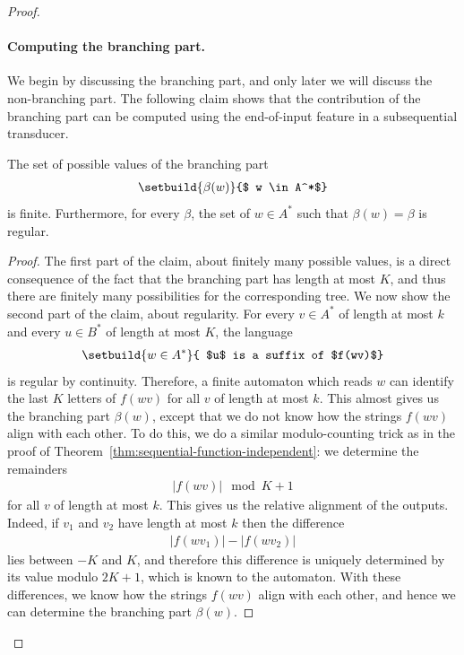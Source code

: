 \begin{proof}
\paragraph*{Computing the branching part.} We begin by discussing the branching part, and only later we will discuss the non-branching part.   The following claim shows that the contribution of the branching part can be computed using the end-of-input feature in a subsequential transducer.


\begin{claim}\label{claim:computing-branching-part} The set of possible values of the branching part 
    \begin{align*}
    \setbuild {\beta(w)}{$ w \in A^*$}
    \end{align*}
    is finite. Furthermore, for every $\beta$, the set of $w \in A^*$ such that $\beta(w) = \beta$ is regular.
\end{claim}
\begin{proof}
    The first part of the claim, about finitely many possible values, is a direct consequence of the fact that the branching part has length at most $K$, and thus there are finitely many possibilities for the corresponding tree.  We now show the second part of the claim, about regularity.
    For every $v \in A^*$ of length at most $k$ and every $u \in B^*$ of length at most $K$, the language 
    \begin{align*}
    \setbuild{ w \in A^*}{ $u$ is a suffix of $f(wv)$}
    \end{align*}
    is regular by continuity. Therefore, a finite automaton which reads $w$ can identify the last $K$ letters of $f(wv)$ for all $v$ of length at most $k$. This almost gives us the branching part $\beta(w)$, except that we do not know how the strings $f(wv)$ align with each other. To do this, we do a similar modulo-counting trick as in the proof of Theorem~\ref{thm:sequential-function-independent}: we determine the remainders
    \begin{align*}
    |f(wv)| \mod K+1
    \end{align*}
    for all $v$ of length at most $k$. This gives us the relative alignment
    of the outputs. Indeed, if $v_1$ and $v_2$ have length at most $k$ then the difference 
    \begin{align*}
    |f(wv_1)| - |f(wv_2)| 
    \end{align*}
    lies between $-K$ and $K$, and therefore this difference is uniquely determined by its value modulo $2K+1$, which is known to the automaton.
    With these differences, we know how the strings $f(wv)$ align with each other, and hence we can determine the branching part $\beta(w)$.
\end{proof}



\end{proof}
